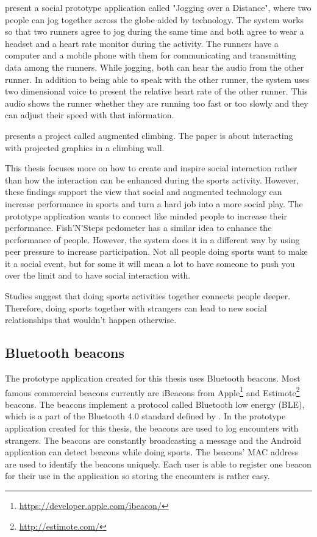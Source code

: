 \cite{joggingOverDistance} present a social prototype application called "Jogging over a Distance", where two people can jog together across the globe aided by technology. The system works so that two runners agree to jog during the same time and both agree to wear a headset and a heart rate monitor during the activity. The runners have a computer and a mobile phone with them for communicating and transmitting data among the runners. While jogging, both can hear the audio from the other runner. In addition to being able to speak with the other runner, the system uses two dimensional voice to present the relative heart rate of the other runner. This audio shows the runner whether they are running too fast or too slowly and they can adjust their speed with that information.

\cite{augmentedClimbing} presents a project called augmented climbing. The paper is about interacting with projected graphics in a climbing wall. 

This thesis focuses more on how to create and inspire social interaction rather than how the interaction can be enhanced during the sports activity. However, these  findings support the view that social and augmented technology can increase performance in sports and turn a hard job into a more social play. The prototype application wants to connect like minded people to increase their performance. Fish’N’Steps pedometer has a similar idea to enhance the performance of people. However, the system does it in a different way by using peer pressure to increase participation. Not all people doing sports want to make it a social event, but for some it will mean a lot to have someone to push you over the limit and to have social interaction with.

Studies suggest that doing sports activities together connects people deeper. Therefore, doing sports together with strangers can lead to new social relationships that wouldn’t happen otherwise.


\subsection{Bluetooth beacons}


The prototype application created for this thesis uses Bluetooth beacons. Most famous commercial beacons currently are iBeacons from Apple\footnote{\url{https://developer.apple.com/ibeacon/}} and Estimote\footnote{\url{http://estimote.com/}} beacons. The beacons implement a protocol called Bluetooth low energy (BLE), which is a part of the Bluetooth 4.0 standard defined by \cite{bluetooth}. In the prototype application created for this thesis, the beacons are used to log encounters with strangers. The beacons are constantly broadcasting a message and the Android application can detect beacons while doing sports. The beacons' MAC address are used to identify the beacons uniquely. Each user is able to register one beacon for their use in the application so storing the encounters is rather easy.

